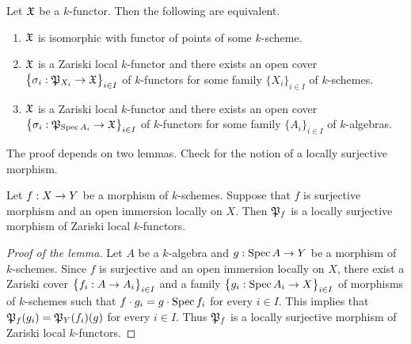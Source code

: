 \begin{theorem}\label{theorem:representabilitybasicresult}
Let ${\mathfrak X}$ be a $k$-functor. Then the following are equivalent.
\begin{enumerate}[label=\emph{\textbf{(\roman*)}}, leftmargin=1.5em]
\item ${\mathfrak X}$ is isomorphic with functor of points of some $k$-scheme.
\item ${\mathfrak X}$ is a Zariski local $k$-functor and there exists an open cover $\big\{\sigma_i:{\mathfrak P}_{X_i}\rightarrow {\mathfrak X}\big\}_{i\in I}$ of $k$-functors for some family $\{X_i\}_{i\in I}$ of $k$-schemes.
\item ${\mathfrak X}$ is a Zariski local $k$-functor and there exists an open cover $\big\{\sigma_i:{\mathfrak P}_{\mathrm{Spec}\, A_i}\rightarrow {\mathfrak X}\big\}_{i\in I}$ of $k$-functors for some family $\{A_i\}_{i\in I}$ of $k$-algebras.
\end{enumerate}
\end{theorem}
\noindent
The proof depends on two lemmas. Check {\cite[Definition 7.1]{Sheaves}} for the notion of a locally surjective morphism.

\begin{lemma}\label{lemma:openimmersionslocallyondomainarezariskilocalkfunctors}
Let $f:X\rightarrow Y$ be a morphism of $k$-schemes. Suppose that $f$ is surjective morphism and an open immersion locally on $X$. Then ${\mathfrak P}_f$ is a locally surjective morphism of Zariski local $k$-functors. 
\end{lemma}
\begin{proof}[Proof of the lemma]
Let $A$ be a $k$-algebra and $g:\mathrm{Spec}\, A\rightarrow Y$ be a morphism of $k$-schemes. Since $f$ is surjective and an open immersion locally on $X$, there exist a Zariski cover $\big\{f_i:A\rightarrow A_i\big\}_{i\in I}$ and a family $\big\{g_i:\mathrm{Spec}\, A_i\rightarrow X\big\}_{i\in I}$ of morphisms of $k$-schemes such that $f\cdot g_i = g\cdot \mathrm{Spec}\, f_i$ for every $i\in I$. This implies that ${\mathfrak P}_f(g_i) = {\mathfrak P}_Y(f_i)(g)$ for every $i\in I$. Thus ${\mathfrak P}_f$ is a locally surjective morphism of Zariski local $k$-functors.
\end{proof}

